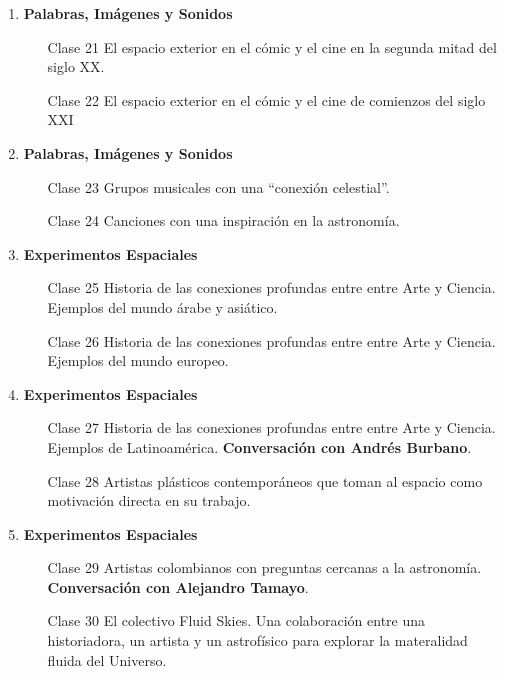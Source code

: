 \documentclass{report}
\begin{document}
\begin{enumerate}
\item {\bf Palabras, Im\'agenes y Sonidos}
\begin{itemize}
\item[Clase 21] El espacio exterior en el c\'omic y el cine en la
  segunda mitad del siglo XX. 
\item[Clase 22] El espacio exterior en el c\'omic y el cine de
  comienzos del siglo XXI
\end{itemize}

\item {\bf Palabras, Im\'agenes y Sonidos}
\begin{itemize}
\item[Clase 23] Grupos musicales con una ``conexi\'on celestial''.
\item[Clase 24] Canciones con una inspiraci\'on en la astronom\'ia. 
\end{itemize}

\item {\bf Experimentos Espaciales}
\begin{itemize}
\item[Clase 25] Historia de las conexiones profundas entre entre Arte
  y Ciencia. Ejemplos del mundo \'arabe y asi\'atico.
\item[Clase 26]  Historia de las conexiones profundas entre entre Arte
  y Ciencia. Ejemplos del mundo europeo. 
\end{itemize}

\item {\bf Experimentos Espaciales}
\begin{itemize}
\item[Clase 27] Historia de las conexiones profundas entre entre Arte
  y Ciencia. Ejemplos de Latinoam\'erica. {\bf Conversaci\'on con
    Andr\'es Burbano}. 
\item[Clase 28] Artistas pl\'asticos contempor\'aneos que toman al espacio como
  motivaci\'on directa en su trabajo. 
\end{itemize}

\item {\bf Experimentos Espaciales}
\begin{itemize}
\item[Clase 29] Artistas colombianos con preguntas cercanas a la
  astronom\'ia. {\bf Conversaci\'on con Alejandro Tamayo}.
\item[Clase 30] El colectivo Fluid Skies. Una colaboraci\'on entre una
  historiadora, un artista y un astrof\'isico para explorar la
  materalidad fluida del Universo.
\end{itemize}

\end{enumerate}
\end{document}
